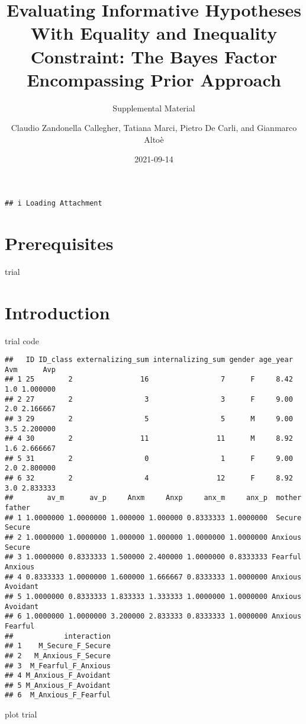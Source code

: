 \documentclass[
]{book}
\title{Evaluating Informative Hypotheses With Equality and Inequality Constraint: The Bayes Factor Encompassing Prior Approach}
\subtitle{Supplemental Material}
\author{Claudio Zandonella Callegher, Tatiana Marci, Pietro De Carli, and Gianmarco Altoè}
\date{2021-09-14}
\begin{document}
\maketitle

{
\setcounter{tocdepth}{1}
\tableofcontents
}
\begin{verbatim}
## i Loading Attachment
\end{verbatim}

\hypertarget{prerequisites}{%
\chapter*{Prerequisites}\label{prerequisites}}

trial

\hypertarget{intro}{%
\chapter{Introduction}\label{intro}}

trial code

\begin{verbatim}
##   ID ID_class externalizing_sum internalizing_sum gender age_year Avm      Avp
## 1 25        2                16                 7      F     8.42 1.0 1.000000
## 2 27        2                 3                 3      F     9.00 2.0 2.166667
## 3 29        2                 5                 5      M     9.00 3.5 2.200000
## 4 30        2                11                11      M     8.92 1.6 2.666667
## 5 31        2                 0                 1      F     9.00 2.0 2.800000
## 6 32        2                 4                12      F     8.92 3.0 2.833333
##        av_m      av_p     Anxm     Anxp     anx_m     anx_p  mother   father
## 1 1.0000000 1.0000000 1.000000 1.000000 0.8333333 1.0000000  Secure   Secure
## 2 1.0000000 1.0000000 1.000000 1.000000 1.0000000 1.0000000 Anxious   Secure
## 3 1.0000000 0.8333333 1.500000 2.400000 1.0000000 0.8333333 Fearful  Anxious
## 4 0.8333333 1.0000000 1.600000 1.666667 0.8333333 1.0000000 Anxious Avoidant
## 5 1.0000000 0.8333333 1.833333 1.333333 1.0000000 1.0000000 Anxious Avoidant
## 6 1.0000000 1.0000000 3.200000 2.833333 0.8333333 1.0000000 Anxious  Fearful
##            interaction
## 1    M_Secure_F_Secure
## 2   M_Anxious_F_Secure
## 3  M_Fearful_F_Anxious
## 4 M_Anxious_F_Avoidant
## 5 M_Anxious_F_Avoidant
## 6  M_Anxious_F_Fearful
\end{verbatim}

plot trial
\end{document}
